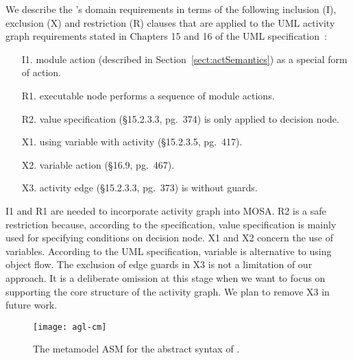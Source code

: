 We describe the \agl's domain requirements in terms of the following inclusion (I), exclusion (X) and restriction (R) clauses that are applied to the UML activity graph requirements stated in Chapters 15 and 16 of the UML specification~\cite{omg_unified_2015}:

\begin{itemize}%
	\item[I1.] module action (described in Section~\ref{sect:actSemantics}) as a special form of action.
	\item[R1.] executable node performs a sequence of module actions.
	\item[R2.] value specification (\S{15.2.3.3}, pg.~374) is only applied to decision node.
	\item[X1.] using variable with activity (\S{15.2.3.5}, pg.~417).
	\item[X2.] variable action (\S{16.9}, pg.~467).
  \item[X3.] activity edge (\S{15.2.3.3}, pg.~373) is without guards.
\end{itemize}

I1 and R1 are needed to incorporate activity graph into MOSA. R2 is a safe restriction because, according to the specification, value specification is mainly used for specifying conditions on decision node. X1 and X2 concern the use of variables. According to the UML specification, variable is alternative to using object flow. The exclusion of edge guards in X3 is not a limitation of our approach. It is a deliberate omission at this stage when we want to focus on supporting the core structure of the activity graph. We plan to remove X3 in future work.
%
%
\begin{figure*}[ht]
	\begin{center}
		\texttt{[image: agl-cm]}
	\end{center}
	\caption{The metamodel ASM for the abstract syntax of \agl.} %
	\label{fig:agl-abstractSyntax}
\end{figure*}

